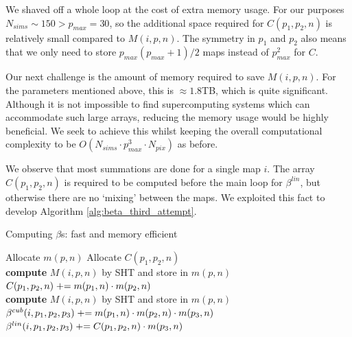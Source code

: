 We shaved off a whole loop at the cost of extra memory usage. For our purposes $N_{sims} \sim 150 > p_{max} = 30$, so the additional space required for $C(p_1,p_2,n)$ is relatively small compared to $M(i,p,n)$. The symmetry in $p_1$ and $p_2$ also means that we only need to store $p_{max}(p_{max}+1)/2$ maps instead of $p_{max}^2$ for $C$.

Our next challenge is the amount of memory required to save $M(i,p,n)$. For the parameters mentioned above, this is $\approx 1.8$TB, which is quite significant. Although it is not impossible to find supercomputing systems which can accommodate such large arrays, reducing the memory usage would be highly beneficial. We seek to achieve this whilst keeping the overall computational complexity to be $O(N_{sims} \cdot p_{max}^3 \cdot N_{pix})$ as before.

We observe that most summations are done for a single map $i$. The array $C(p_1,p_2,n)$ is required to be computed before the main loop for $\beta^{lin}$, but otherwise there are no `mixing' between the maps. We exploited this fact to develop Algorithm \ref{alg:beta_third_attempt}.

\begin{algorithm}[htbp]
	\caption{Computing $\beta$s: fast and memory efficient}
	\label{alg:beta_third_attempt}
	\begin{algorithmic}[1] %
		\State Allocate $m(p,n)$ 
		\State Allocate $C(p_1,p_2,n)$ 
		\\
				\State \textbf{compute} $M(i,p,n)$ by SHT and store in $m(p,n)$
			\EndFor
			\\
					\State $C(p_1,p_2,n) \mathrel{+}= m(p_1,n) \cdot m(p_2,n)$
				\EndFor
			\EndFor
		\EndFor
		\\
				\State \textbf{compute} $M(i,p,n)$ by SHT and store in $m(p,n)$
			\EndFor
			\\
					\label{alg:thrid_attempt_main_loop}	
					\State $\beta^{cub}(i, p_1, p_2, p_3) \mathrel{+}= m(p_1,n) \cdot m(p_2,n) \cdot m(p_3,n)$
					\State $\beta^{lin}(i, p_1, p_2, p_3) \mathrel{+}= C(p_1, p_2, n) \cdot m( p_3, n)$
				\EndFor
			\EndFor
		\EndFor
	\end{algorithmic}
\end{algorithm}

